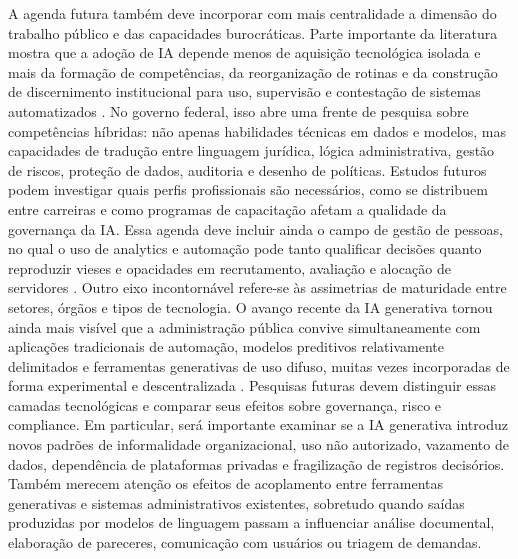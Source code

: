 \documentclass[12pt,a4paper]{article}
\begin{document}
A agenda futura também deve incorporar com mais centralidade a dimensão do trabalho público e das capacidades burocráticas. Parte importante da literatura mostra que a adoção de IA depende menos de aquisição tecnológica isolada e mais da formação de competências, da reorganização de rotinas e da construção de discernimento institucional para uso, supervisão e contestação de sistemas automatizados \autocite{melo2026competencias} \autocite{chilunjika2022artificial}. No governo federal, isso abre uma frente de pesquisa sobre competências híbridas: não apenas habilidades técnicas em dados e modelos, mas capacidades de tradução entre linguagem jurídica, lógica administrativa, gestão de riscos, proteção de dados, auditoria e desenho de políticas. Estudos futuros podem investigar quais perfis profissionais são necessários, como se distribuem entre carreiras e como programas de capacitação afetam a qualidade da governança da IA. Essa agenda deve incluir ainda o campo de gestão de pessoas, no qual o uso de analytics e automação pode tanto qualificar decisões quanto reproduzir vieses e opacidades em recrutamento, avaliação e alocação de servidores \autocite{cho2023human} \autocite{barros2025inteligencia}.
Outro eixo incontornável refere-se às assimetrias de maturidade entre setores, órgãos e tipos de tecnologia. O avanço recente da IA generativa tornou ainda mais visível que a administração pública convive simultaneamente com aplicações tradicionais de automação, modelos preditivos relativamente delimitados e ferramentas generativas de uso difuso, muitas vezes incorporadas de forma experimental e descentralizada \autocite{mariano2026inteligencia} \autocite{lyrio2025emerging}. Pesquisas futuras devem distinguir essas camadas tecnológicas e comparar seus efeitos sobre governança, risco e compliance. Em particular, será importante examinar se a IA generativa introduz novos padrões de informalidade organizacional, uso não autorizado, vazamento de dados, dependência de plataformas privadas e fragilização de registros decisórios. Também merecem atenção os efeitos de acoplamento entre ferramentas generativas e sistemas administrativos existentes, sobretudo quando saídas produzidas por modelos de linguagem passam a influenciar análise documental, elaboração de pareceres, comunicação com usuários ou triagem de demandas.
\end{document}
